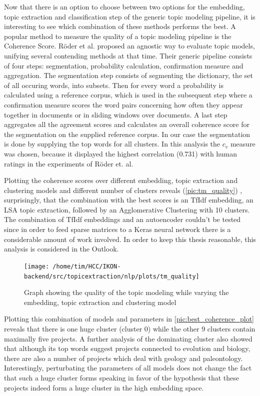Now that there is an option to choose between two options for the embedding, topic extraction and classification step of the generic topic modeling pipeline, it is interesting to see which combination of these methods performs the best. A popular method to measure the quality of a topic modeling pipeline is the Coherence Score. Röder et al.\cite{roderExploringSpaceTopic2015a} proposed an agnostic way to evaluate topic models, unifying several contending methods at that time. Their generic pipeline consists of four steps: segmentation, probability calculation, confirmation measure and aggregation. The segmentation step consists of segmenting the dictionary, the set of all occuring words, into subsets. Then for every word a probability is calculated using a reference corpus, which is used in the subsequent step where a confirmation measure scores the word pairs concerning how often they appear together in documents or in sliding windows over documents. A last step aggregates all the agreement scores and calculates an overall coherence score for the segmentation on the supplied reference corpus. In our case the segmentation is done by supplying the top words for all clusters.  In this analysis the $c_v$ measure was chosen, because it displayed the highest correlation (0.731) with human ratings in the experiments of Röder et. al.

Plotting the coherence scores over different embedding, topic extraction and clustering models and different number of clusters reveals (\autoref{pic:tm_quality}) , surprisingly, that the combination with the best scores is an TfIdf embedding, an LSA topic extraction, followed by an Agglomerative Clustering with 10 clusters. The combination of TfIdf embeddings and an autoencoder couldn't be tested since in order to feed sparse matrices to a Keras neural network there is a considerable amount of work involved. In order to keep this thesis reasonable, this analysis is considered in the Outlook.

\begin{figure}[t]
	\centering
	\texttt{[image: /home/tim/HCC/IKON-backend/src/topicextraction/nlp/plots/tm\_quality]}
	\caption{\label{pic:tm_quality} Graph showing the quality of the topic modeling while varying the embedding, topic extraction and clustering model}
\end{figure}

Plotting this combination of models and parameters in \autoref{pic:best_coherence_plot} reveals that there is one huge cluster (cluster 0) while the other 9 clusters contain maximally five projects. A further analysis of the dominating cluster also showed that although its top words suggest projects connected to evolution and biology, there are also a number of projects which deal with geology and paleontology. Interestingly, perturbating the parameters of all models does not change the fact that such a huge cluster forms speaking in favor of the hypothesis that these projects indeed form a huge cluster in the high embedding space.

